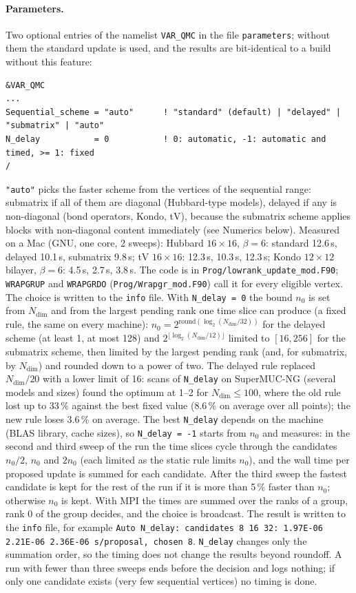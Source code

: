 \paragraph{Parameters.}
Two optional entries of the namelist \texttt{VAR\_QMC} in the file \texttt{parameters}; without them the
standard update is used, and the results are bit-identical to a build without this feature:
\begin{verbatim}
&VAR_QMC
...
Sequential_scheme = "auto"      ! "standard" (default) | "delayed" | "submatrix" | "auto"
N_delay           = 0           ! 0: automatic, -1: automatic and timed, >= 1: fixed
/
\end{verbatim}
\texttt{"auto"} picks the faster scheme from the vertices of the sequential range: submatrix if all of
them are diagonal (Hubbard-type models), delayed if any is non-diagonal (bond operators, Kondo, tV), because
the submatrix scheme applies blocks with non-diagonal content immediately (see Numerics below). Measured on a
Mac (GNU, one core, 2 sweeps): Hubbard $16\times16$, $\beta=6$: standard 12.6\,s, delayed 10.1\,s, submatrix
9.8\,s; tV $16\times16$: 12.3\,s, 10.3\,s, 12.3\,s; Kondo $12\times12$ bilayer, $\beta=6$: 4.5\,s, 2.7\,s, 3.8\,s.
The code is in \texttt{Prog/lowrank\_update\_mod.F90}; \texttt{WRAPGRUP} and \texttt{WRAPGRDO}
(\texttt{Prog/Wrapgr\_mod.F90}) call it for every eligible vertex. The choice is written to the \texttt{info} file. With \texttt{N\_delay = 0} the bound $n_0$ is set from
$N_{\text{dim}}$ and from the largest pending rank one time slice can produce (a fixed rule, the same on
every machine): $n_0 = 2^{\mathrm{round}(\log_2(N_{\text{dim}}/32))}$ for the delayed scheme (at least 1, at most 128) and
$2^{\lfloor\log_2(N_{\text{dim}}/12)\rfloor}$ limited to $[16, 256]$ for the submatrix scheme, then limited by the
largest pending rank (and, for submatrix, by $N_{\text{dim}}$) and rounded down to a power of two. The delayed rule replaced
$N_{\text{dim}}/20$ with a lower limit of 16: scans of \texttt{N\_delay} on SuperMUC-NG (several models and sizes) found the optimum at 1--2 for
$N_{\text{dim}}\le 100$, where the old rule lost up to 33\,\% against the best fixed value (8.6\,\% on average over all
points); the new rule loses 3.6\,\% on average. The best \texttt{N\_delay} depends on the machine (BLAS library, cache sizes), so
\texttt{N\_delay = -1} starts from $n_0$ and measures: in the second and third sweep of the run the time
slices cycle through the candidates $n_0/2$, $n_0$ and $2n_0$ (each limited as the static rule limits
$n_0$), and the wall time per proposed update is summed for each candidate. After the third sweep the
fastest candidate is kept for the rest of the run if it is more than 5\,\% faster than $n_0$; otherwise
$n_0$ is kept. With MPI the times are summed over the ranks of a group, rank 0 of the group decides, and
the choice is broadcast. The result is written to the \texttt{info} file, for example
\texttt{Auto N\_delay: candidates 8 16 32: 1.97E-06 2.21E-06 2.36E-06 s/proposal, chosen 8}.
\texttt{N\_delay} changes only the summation order, so the timing does not change the results beyond
roundoff. A run with fewer than three sweeps ends before the decision and logs nothing; if only one
candidate exists (very few sequential vertices) no timing is done.

